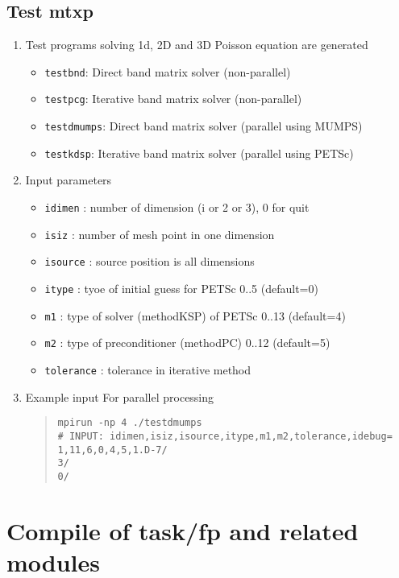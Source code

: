 \documentclass[11pt]{article}
\begin{document}
\subsection{Test mtxp}
\begin{enumerate}
\item
Test programs solving 1d, 2D and 3D Poisson equation are generated
\begin{itemize}
\item
\verb|testbnd|: Direct band matrix solver (non-parallel)
\item
\verb|testpcg|: Iterative band matrix solver (non-parallel)
\item
\verb|testdmumps|: Direct band matrix solver (parallel using MUMPS)
\item
\verb|testkdsp|: Iterative band matrix solver (parallel using PETSc)
\end{itemize}
\item
Input parameters
\begin{itemize}
\item
\verb|idimen| : number of dimension (i or 2 or 3),  0 for quit
\item
\verb|isiz| : number of mesh point in one dimension
\item
\verb|isource| : source position is all dimensions
\item
\verb|itype| : tyoe of initial guess for PETSc  0..5 (default=0)
\item
\verb|m1| : type of solver (methodKSP) of PETSc  0..13 (default=4)
\item
\verb|m2| : type of preconditioner (methodPC)  0..12 (default=5)
\item
\verb|tolerance| : tolerance in iterative method
\end{itemize}
\item
Example input For parallel processing
\begin{quote}
\begin{verbatim}
mpirun -np 4 ./testdmumps
# INPUT: idimen,isiz,isource,itype,m1,m2,tolerance,idebug= 
1,11,6,0,4,5,1.D-7/
3/
0/
\end{verbatim}
\end{quote}
\end{enumerate}

\section{Compile of task/fp and related modules}
\end{document}
